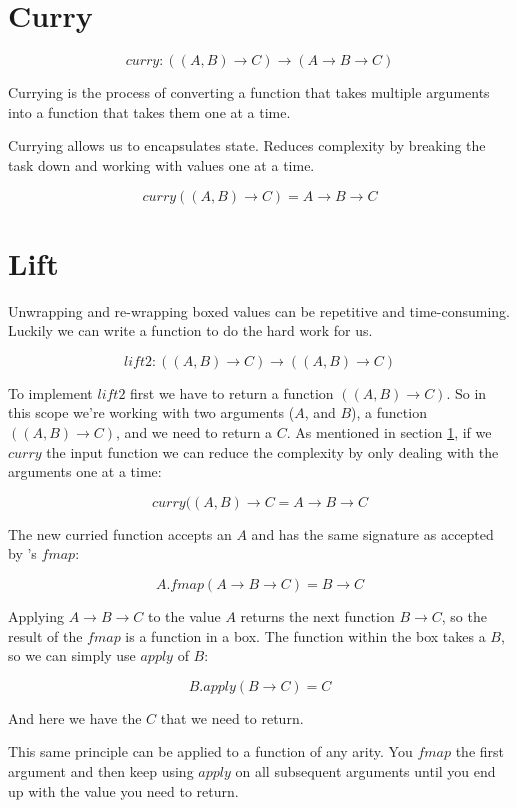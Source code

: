 \documentclass{shpdocumentation}
\begin{document}
\section{Curry}\label{curry}

\[ curry\colon ((A, B) \to C) \to (A \to B \to C) \]

Currying is the process of converting a function that takes multiple arguments into a function that takes them one at a time.

Currying allows us to encapsulates state. Reduces complexity by breaking the task down and working with values one at a time.

\[ curry((A, B) \to C) = A \to B \to C \]

\section{Lift}

Unwrapping and re-wrapping boxed values can be repetitive and time-consuming.  Luckily we can write a function to do the hard work for us.

\[ lift2\colon ((A, B) \to C) \to ((\boxed{A}, \boxed{B}) \to \boxed{C}) \]

To implement $lift2$ first we have to return a function $((\boxed{A}, \boxed{B}) \to \boxed{C})$.  So in this scope we're working with two arguments ($\boxed{A}$, and $\boxed{B}$), a function $((A, B) \to C)$, and we need to return a $\boxed{C}$.  As mentioned in section \ref{curry}, if we $curry$ the input function we can reduce the complexity by only dealing with the arguments one at a time:

\[ curry((A, B) \to C = A \to B \to C \]

The new curried function accepts an $A$ and has the same signature as accepted by 's $fmap$:

\[ \boxed{A}.fmap(A \to B \to C) = \boxed{B \to C} \]

Applying $A \to B \to C$ to the value $A$ returns the next function $B \to C$, so the result of the $fmap$ is a function in a box.  The function within the box takes a $B$, so we can simply use $apply$ of $\boxed{B}$:

\[ \boxed{B}.apply(\boxed{B \to C}) = \boxed{C} \]

And here we have the $\boxed{C}$ that we need to return.

This same principle can be applied to a function of any arity.  You $fmap$ the first argument and then keep using $apply$ on all subsequent arguments until you end up with the value you need to return.
\end{document}
